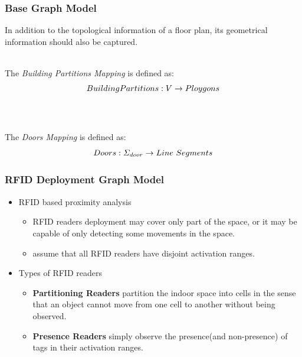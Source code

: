 
\begin{frame}
\frametitle{Base Graph Model}

  \small{In addition to the topological information of a floor plan, its geometrical information should also be captured.}
  \\~\\
  \pause

  The \textrm{\em Building Partitions Mapping} is defined as:
  \pause
  \begin{equation}
  \mathnormal{BuildingPartitions: V \rightarrow Ploygons}
  \end{equation}
  \\~\\
  \pause

  The \textrm{\em Doors Mapping} is defined as:
  \pause
  \begin{equation}
  \mathnormal{Doors: \Sigma_{door} \rightarrow Line~Segments}
  \end{equation}

\end{frame}



\begin{frame}
\frametitle{RFID Deployment Graph Model}

\begin{itemize}
  \item RFID based proximity analysis
      \begin{itemize}
        \item RFID readers deployment may cover only part of the space, or it may be capable of only detecting some movements in the space.
        \item assume that all RFID readers have disjoint activation ranges.
      \end{itemize}
  \item Types of RFID readers
      \begin{itemize}
        \item \textbf{Partitioning Readers} partition the indoor space into cells in the sense that an object cannot move from one cell to another without being observed.
        \item \textbf{Presence Readers} simply observe the presence(and non-presence) of tags in their activation ranges.
      \end{itemize}
\end{itemize}

\end{frame}

